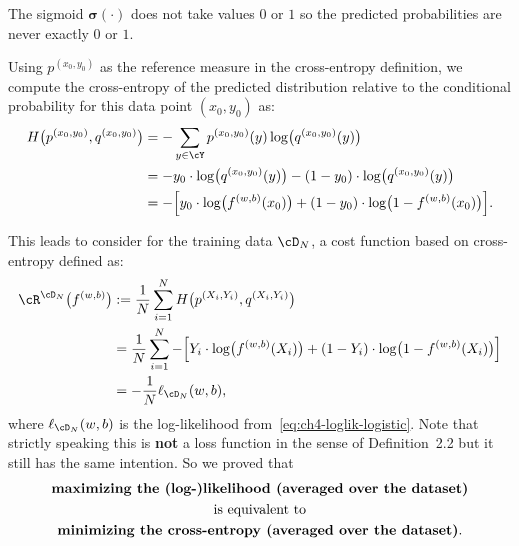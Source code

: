 \begin{remark}
The sigmoid $\boldsymbol{\sigma}(\cdot)$ does not take values $0$ or $1$ so the predicted
probabilities are never exactly $0$ or $1$.
\end{remark}

Using $p^{(x_0, y_0)}$ as the reference measure in the cross-entropy definition, we
compute the cross-entropy of the predicted distribution relative to the conditional probability for this data point $(x_0, y_0)$ as:
\begin{align}
H\bigl(p^{(x_0, y_0)}, q^{(x_0, y_0)}\bigr) &= -\sum_{y \in \cY} p^{(x_0, y_0)}(y) \log\bigl( q^{(x_0, y_0)}(y) \bigr) \nonumber\\
&= -y_0 \cdot \log\bigl( q^{(x_0, y_0)}(y) \bigr) - (1 - y_0) \cdot \log\bigl( q^{(x_0, y_0)}(y) \bigr) \nonumber\\
&= -\Bigl[ y_0 \cdot \log\bigl( f^{(w,b)}(x_0) \bigr) + (1 - y_0) \cdot \log\bigl( 1 - f^{(w,b)}(x_0) \bigr) \Bigr]. \label{eq:ch4-ce-pointwise}
\end{align}

This leads to consider for the training data $\cD_N$, a cost function based on
cross-entropy defined as:
\begin{align}
\cR^{\cD_N}\bigl( f^{(w,b)} \bigr) &:= \frac{1}{N} \sum_{i=1}^N H\bigl( p^{(X_i, Y_i)}, q^{(X_i, Y_i)} \bigr) \nonumber\\
&= \frac{1}{N} \sum_{i=1}^N -\Bigl[ Y_i \cdot \log\bigl( f^{(w,b)}(X_i) \bigr) + (1 - Y_i) \cdot \log\bigl( 1 - f^{(w,b)}(X_i) \bigr) \Bigr] \nonumber\\
&= -\frac{1}{N} \ell_{\cD_N}(w, b), \label{eq:ch4-ce-cost}
\end{align}
where $\ell_{\cD_N}(w, b)$ is the log-likelihood from~\eqref{eq:ch4-loglik-logistic}. Note that strictly speaking
this is \textbf{not} a loss function in the sense of Definition~2.2 but it still has the same
intention. So we proved that
\begin{equation}\label{eq:ch4-mle-ce-equiv}
\begin{gathered}
\text{\textbf{maximizing the (log-)likelihood (averaged over the dataset)}} \\
\text{is equivalent to} \\
\text{\textbf{minimizing the cross-entropy (averaged over the dataset)}}.
\end{gathered}
\end{equation}

